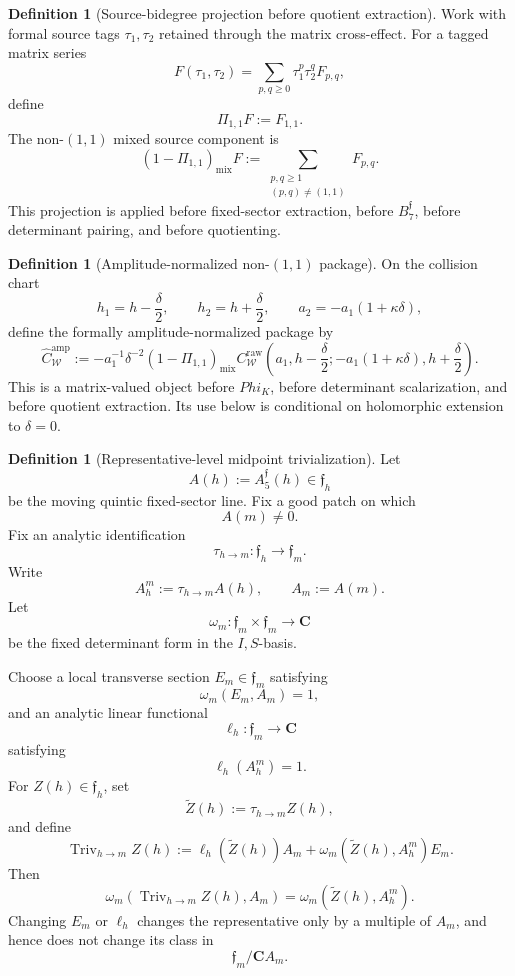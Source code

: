 \documentclass[11pt,a4paper]{amsart}
\def\Phi{Phi}%
\theoremstyle{plain}
\theoremstyle{definition}
\newtheorem{definition}[theorem]{Definition}
\begin{document}
\begin{definition}[Source-bidegree projection before quotient extraction]
\label{def:source-bidegree-projection-before-quotient}
Work with formal source tags \(\tau_1,\tau_2\) retained through the matrix
cross-effect.  For a tagged matrix series
\[
F(\tau_1,\tau_2)=\sum_{p,q\ge0}\tau_1^p\tau_2^qF_{p,q},
\]
define
\[
\Pi_{1,1}F:=F_{1,1}.
\]
The non-\((1,1)\) mixed source component is
\[
(1-\Pi_{1,1})_{\mathrm{mix}}F
:=
\sum_{\substack{p,q\ge1\\(p,q)\ne(1,1)}}F_{p,q}.
\]
This projection is applied before fixed-sector extraction, before
\(B_7^{\mathfrak f}\), before determinant pairing, and before quotienting.
\end{definition}

\begin{definition}[Amplitude-normalized non-\((1,1)\) package]
\label{def:amplitude-normalized-non-11-package}
On the collision chart
\[
h_1=h-\frac{\delta}{2},
\qquad
h_2=h+\frac{\delta}{2},
\qquad
a_2=-a_1(1+\kappa\delta),
\]
define the formally amplitude-normalized package by
\[
\widehat C_{\mathcal W}^{\mathrm{amp}}
:=
-a_1^{-1}\delta^{-2}
(1-\Pi_{1,1})_{\mathrm{mix}}
C_{\mathcal W}^{\mathrm{raw}}
\!\left(a_1,h-\frac{\delta}{2};
        -a_1(1+\kappa\delta),h+\frac{\delta}{2}\right).
\]
This is a matrix-valued object before \(\Phi_K\), before determinant
scalarization, and before quotient extraction.  Its use below is conditional
on holomorphic extension to \(\delta=0\).
\end{definition}

\begin{definition}[Representative-level midpoint trivialization]
\label{def:representative-level-midpoint-trivialization}
Let
\[
A(h):=A_5^{\mathfrak f}(h)\in\mathfrak f_h
\]
be the moving quintic fixed-sector line.  Fix a good patch on which
\[
A(m)\ne0.
\]
Fix an analytic identification
\[
\tau_{h\to m}:\mathfrak f_h\longrightarrow\mathfrak f_m.
\]
Write
\[
A_h^m:=\tau_{h\to m}A(h),
\qquad
A_m:=A(m).
\]
Let
\[
\omega_m:\mathfrak f_m\times\mathfrak f_m\to\mathbf C
\]
be the fixed determinant form in the \(I,S\)-basis.

Choose a local transverse section \(E_m\in\mathfrak f_m\) satisfying
\[
\omega_m(E_m,A_m)=1,
\]
and an analytic linear functional
\[
\ell_h:\mathfrak f_m\to\mathbf C
\]
satisfying
\[
\ell_h(A_h^m)=1.
\]
For \(Z(h)\in\mathfrak f_h\), set
\[
\widetilde Z(h):=\tau_{h\to m}Z(h),
\]
and define
\[
\operatorname{Triv}_{h\to m}Z(h)
:=
\ell_h(\widetilde Z(h))A_m
+
\omega_m(\widetilde Z(h),A_h^m)E_m.
\]
Then
\[
\omega_m\!\left(\operatorname{Triv}_{h\to m}Z(h),A_m\right)
=
\omega_m(\widetilde Z(h),A_h^m).
\]
Changing \(E_m\) or \(\ell_h\) changes the representative only by a multiple of
\(A_m\), and hence does not change its class in
\[
\mathfrak f_m/\mathbf C A_m.
\]
\end{definition}
\end{document}
